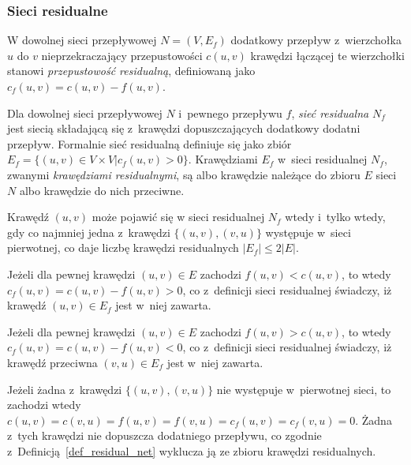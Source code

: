 \subsubsection{\textbf{Sieci residualne}}
\par{
  W dowolnej sieci przepływowej $N=(V, E_f)$ dodatkowy przepływ z~wierzchołka $u$ do $v$ nieprzekraczający przepustowości $c(u, v)$ krawędzi łączącej te wierzchołki stanowi \emph{przepustowość residualną}, definiowaną jako $c_f(u ,v) = c(u, v) - f(u, v)$.
  \begin{definition}
    Dla dowolnej sieci przepływowej $N$ i~pewnego przepływu $f$, \emph{sieć residualna} $N_f$ jest siecią składającą się z~krawędzi dopuszczających dodatkowy dodatni przepływ.
    Formalnie sieć residualną definiuje się jako zbiór $E_f=\{(u, v) \in V \times V | c_f(u,v) > 0\}$.
    Krawędziami $E_f$ w~sieci residualnej $N_f$, zwanymi \emph{krawędziami residualnymi}, są albo krawędzie należące do zbioru $E$ sieci $N$ albo krawędzie do nich przeciwne.
  \end{definition}
  \begin{theorem}
    Krawędź $(u, v)$ może pojawić się w sieci residualnej $N_f$ wtedy i~tylko wtedy, gdy co najmniej jedna z~krawędzi $\{(u, v), (v, u)\}$ występuje w~sieci pierwotnej, co daje liczbę krawędzi residualnych $|E_f| \leq 2|E|$.
  \end{theorem}
  \begin{bproof}
    Jeżeli dla pewnej krawędzi $(u, v) \in E$ zachodzi $f(u, v) < c(u, v)$, to wtedy $c_f(u, v) = c(u, v) - f(u, v) > 0$, co z~definicji sieci residualnej świadczy, iż krawędź $(u, v) \in E_f$ jest w~niej zawarta.

    Jeżeli dla pewnej krawędzi $(u, v) \in E$ zachodzi $f(u, v) > c(u, v)$, to wtedy $c_f(u, v) = c(u, v) - f(u, v) < 0$, co z~definicji sieci residualnej świadczy, iż krawędź przeciwna $(v, u) \in E_f$  jest w~niej zawarta.

    Jeżeli żadna z~krawędzi $\{(u, v), (v, u)\}$ nie występuje w~pierwotnej sieci, to zachodzi wtedy $c(u, v) = c(v, u) = f(u, v) = f(v, u) = c_f(u, v) = c_f(v, u)=0$.
    Żadna z~tych krawędzi nie dopuszcza dodatniego przepływu, co zgodnie z~Definicją~\ref{def_residual_net} wyklucza ją ze zbioru krawędzi residualnych.
  \end{bproof}
}

